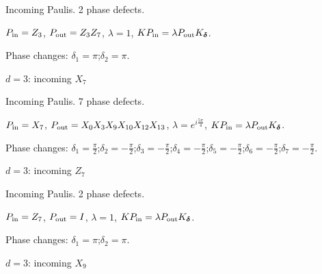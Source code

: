 Incoming Paulis. 2 phase defects.
\begin{center}
\end{center}
\vspace{-1mm}
$P_{\rm in}=Z_{3}$, \quad $P_{\rm out}=Z_{3}Z_{7}$, \quad $\lambda=1$, \qquad $K P_{\rm in}=\lambda P_{\rm out}K_{\boldsymbol\delta}$.
\par\smallskip\begin{minipage}{.98\linewidth}\small Phase changes: $\delta_{1}=\pi$;\quad $\delta_{2}=\pi$.\end{minipage}
\vfill
{\footnotesize\texttt{}}
\newpage
{}
{\Large $d=3$: incoming $X_{7}$}\par
Incoming Paulis. 7 phase defects.
\begin{center}
\end{center}
\vspace{-1mm}
$P_{\rm in}=X_{7}$, \quad $P_{\rm out}=X_{0}X_{3}X_{9}X_{10}X_{12}X_{13}$, \quad $\lambda=e^{i\frac{5\pi}{4}}$, \qquad $K P_{\rm in}=\lambda P_{\rm out}K_{\boldsymbol\delta}$.
\par\smallskip\begin{minipage}{.98\linewidth}\small Phase changes: $\delta_{1}=\frac{\pi}{2}$;\quad $\delta_{2}=-\frac{\pi}{2}$;\quad $\delta_{3}=-\frac{\pi}{2}$;\quad $\delta_{4}=-\frac{\pi}{2}$;\quad $\delta_{5}=-\frac{\pi}{2}$;\quad $\delta_{6}=-\frac{\pi}{2}$;\quad $\delta_{7}=-\frac{\pi}{2}$.\end{minipage}
\vfill
{\footnotesize\texttt{}}
\newpage
{}
{\Large $d=3$: incoming $Z_{7}$}\par
Incoming Paulis. 2 phase defects.
\begin{center}
\end{center}
\vspace{-1mm}
$P_{\rm in}=Z_{7}$, \quad $P_{\rm out}=I$, \quad $\lambda=1$, \qquad $K P_{\rm in}=\lambda P_{\rm out}K_{\boldsymbol\delta}$.
\par\smallskip\begin{minipage}{.98\linewidth}\small Phase changes: $\delta_{1}=\pi$;\quad $\delta_{2}=\pi$.\end{minipage}
\vfill
{\footnotesize\texttt{}}
\newpage
{}
{\Large $d=3$: incoming $X_{9}$}\par
